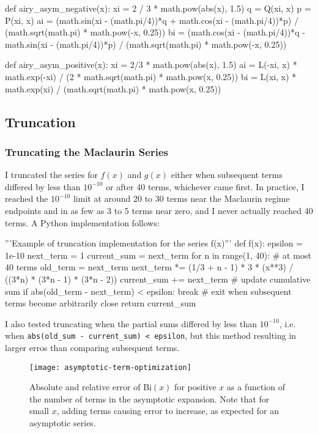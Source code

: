 \documentclass[11pt, a4paper]{article}
\newcommand{\Bi}{\mathrm{Bi}}
\begin{document}
\begin{myminted}
def airy_asym_negative(x):
    xi = 2 / 3 * math.pow(abs(x), 1.5)
    q = Q(xi, x)
    p = P(xi, x)
    ai = (math.sin(xi - (math.pi/4))*q + math.cos(xi - (math.pi/4))*p) / (math.sqrt(math.pi) * math.pow(-x, 0.25))
    bi = (math.cos(xi - (math.pi/4))*q - math.sin(xi - (math.pi/4))*p) / (math.sqrt(math.pi) * math.pow(-x, 0.25))

def airy_asym_positive(x):
    xi = 2/3 * math.pow(abs(x), 1.5)
    ai = L(-xi, x) * math.exp(-xi) / (2 * math.sqrt(math.pi) * math.pow(x, 0.25))
    bi = L(xi, x) * math.exp(xi) / (math.sqrt(math.pi) * math.pow(x, 0.25))
\end{myminted}


\subsection{Truncation}

\subsubsection{Truncating the Maclaurin Series}
I truncated the series for $ f(x) $ and $ g(x) $ either when subsequent terms differed by less than $ 10^{-10} $ or after 40 terms, whichever came first. In practice, I reached the $ 10^{-10} $ limit at around 20 to 30 terms near the Maclaurin regime endpoints and in as few as 3 to 5 terms near zero, and I never actually reached 40 terms. A Python implementation follows:
\begin{myminted}
'''Example of truncation implementation for the series f(x)'''
def f(x):
	epsilon = 1e-10
	next_term = 1
	current_sum = next_term
	for n in range(1, 40):	# at most 40 terms
	    old_term = next_term
	    next_term *= (1/3 + n - 1) * 3 * (x**3) / ((3*n) * (3*n - 1) * (3*n - 2))
	    current_sum += next_term    # update cumulative sum
	    if abs(old_term - next_term) < epsilon: break	# exit when subsequent terms become arbitrarily close
	return current_sum
\end{myminted}
I also tested truncating when the partial sums differed by less than $ 10^{-10} $, i.e. when \texttt{abs(old\_sum - current\_sum) < epsilon}, but this method resulting in larger erros than comparing subsequent terms. 

\begin{figure}[htb!]
	\centering
	\texttt{[image: asymptotic-term-optimization]}
	\vspace{-8mm}
	\caption{Absolute and relative error of $ \Bi(x)$ for positive $ x $ as a function of the number of terms in the asymptotic expansion. Note that for small $ x $, adding terms causing error to increase, as expected for an asymptotic series.} 
	\label{airy:fig:asym-optimization}
\end{figure}
\end{document}
